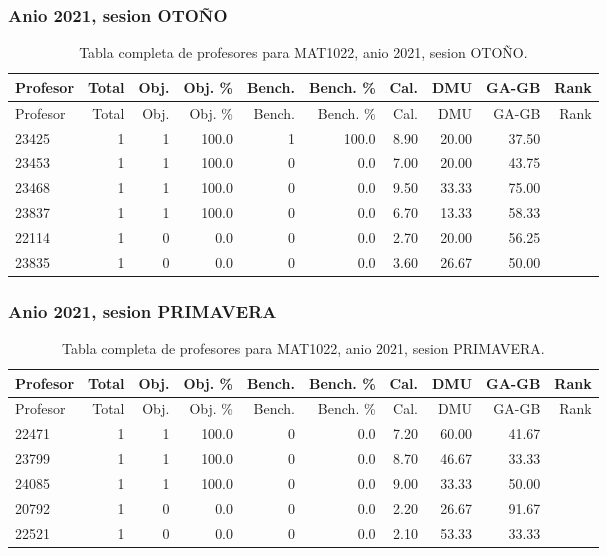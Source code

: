 \subsubsection{Anio 2021, sesion OTOÑO}

\begingroup
\scriptsize
\setlength{\tabcolsep}{3pt}
\begin{longtable}{lrrrrrrrrr}
\caption{Tabla completa de profesores para MAT1022, anio 2021, sesion OTOÑO.}\label{tab:prof-period-mat1022-2021-oto-o-especializado}\\
\toprule
Profesor & Total & Obj. & Obj. \% & Bench. & Bench. \% & Cal. & DMU & GA-GB & Rank \\
\midrule
\endfirsthead
\toprule
Profesor & Total & Obj. & Obj. \% & Bench. & Bench. \% & Cal. & DMU & GA-GB & Rank \\
\midrule
\endhead
23425 & 1 & 1 & 100.0 & 1 & 100.0 & 8.90 & 20.00 & 37.50 &  \\
23453 & 1 & 1 & 100.0 & 0 & 0.0 & 7.00 & 20.00 & 43.75 &  \\
23468 & 1 & 1 & 100.0 & 0 & 0.0 & 9.50 & 33.33 & 75.00 &  \\
23837 & 1 & 1 & 100.0 & 0 & 0.0 & 6.70 & 13.33 & 58.33 &  \\
22114 & 1 & 0 & 0.0 & 0 & 0.0 & 2.70 & 20.00 & 56.25 &  \\
23835 & 1 & 0 & 0.0 & 0 & 0.0 & 3.60 & 26.67 & 50.00 &  \\
\bottomrule
\end{longtable}
\endgroup

\subsubsection{Anio 2021, sesion PRIMAVERA}

\begingroup
\scriptsize
\setlength{\tabcolsep}{3pt}
\begin{longtable}{lrrrrrrrrr}
\caption{Tabla completa de profesores para MAT1022, anio 2021, sesion PRIMAVERA.}\label{tab:prof-period-mat1022-2021-primavera-especializado}\\
\toprule
Profesor & Total & Obj. & Obj. \% & Bench. & Bench. \% & Cal. & DMU & GA-GB & Rank \\
\midrule
\endfirsthead
\toprule
Profesor & Total & Obj. & Obj. \% & Bench. & Bench. \% & Cal. & DMU & GA-GB & Rank \\
\midrule
\endhead
22471 & 1 & 1 & 100.0 & 0 & 0.0 & 7.20 & 60.00 & 41.67 &  \\
23799 & 1 & 1 & 100.0 & 0 & 0.0 & 8.70 & 46.67 & 33.33 &  \\
24085 & 1 & 1 & 100.0 & 0 & 0.0 & 9.00 & 33.33 & 50.00 &  \\
20792 & 1 & 0 & 0.0 & 0 & 0.0 & 2.20 & 26.67 & 91.67 &  \\
22521 & 1 & 0 & 0.0 & 0 & 0.0 & 2.10 & 53.33 & 33.33 &  \\
\bottomrule
\end{longtable}
\endgroup

